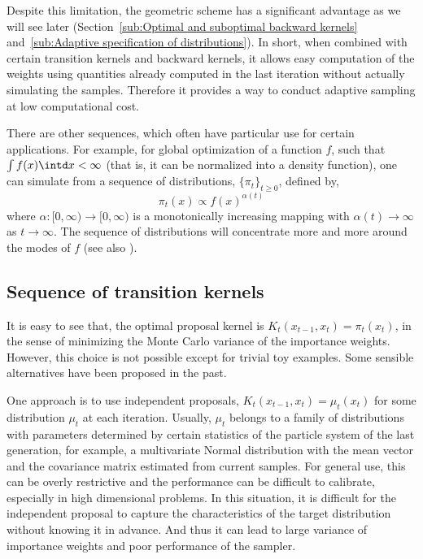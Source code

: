 Despite this limitation, the geometric scheme has a significant advantage as we will see later (Section~\ref{sub:Optimal and suboptimal backward kernels} and~\ref{sub:Adaptive specification of distributions}). In short, when combined with certain transition kernels and backward kernels, it allows easy computation of the weights using quantities already computed in the last iteration without actually simulating the samples. Therefore it provides a way to conduct adaptive sampling at low computational cost.

There are other sequences, which often have particular use for certain applications. For example, for global optimization of a function $f$, such that $\int f(x)\intd x <\infty$ (that is, it can be normalized into a density function), one can simulate from a sequence of distributions, $\{\pi_t\}_{t\ge0}$, defined by,
\begin{equation}
  \pi_t(x) \propto f(x)^{\alpha(t)}
\end{equation}
where $\alpha:[0,\infty)\to[0,\infty)$ is a monotonically increasing mapping with $\alpha(t)\to\infty$ as $t\to\infty$. The sequence of distributions will concentrate more and more around the modes of $f$ (see also \cite{Marinari:1992vx}).

\subsection{Sequence of transition kernels}
\label{sub:Sequence of transition kernels}

It is easy to see that, the optimal proposal kernel is $K_t(x_{t-1}, x_t) = \pi_t(x_t)$, in the sense of minimizing the Monte Carlo variance of the importance weights. However, this choice is not possible except for trivial toy examples. Some sensible alternatives have been proposed in the past.

One approach is to use independent proposals, $K_t(x_{t-1},x_t) = \mu_t(x_t)$ for some distribution $\mu_t$ at each iteration. Usually, $\mu_t$ belongs to a family of distributions with parameters determined by certain statistics of the particle system of the last generation, for example, a multivariate Normal distribution with the mean vector and the covariance matrix estimated from current samples. For general use, this can be overly restrictive and the performance can be difficult to calibrate, especially in high dimensional problems. In this situation, it is difficult for the independent proposal to capture the characteristics of the target distribution without knowing it in advance. And thus it can lead to large variance of importance weights and poor performance of the sampler.

